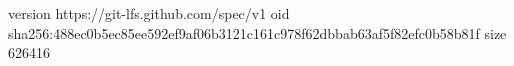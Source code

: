 version https://git-lfs.github.com/spec/v1
oid sha256:488ec0b5ec85ee592ef9af06b3121c161c978f62dbbab63af5f82efc0b58b81f
size 626416
